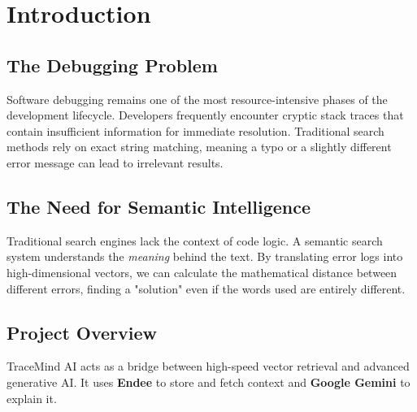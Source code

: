 \documentclass[12pt,a4paper]{report}
\begin{document}
\tableofcontents
\newpage

\chapter{Introduction}
\section{The Debugging Problem}
Software debugging remains one of the most resource-intensive phases of the development lifecycle. Developers frequently encounter cryptic stack traces that contain insufficient information for immediate resolution. Traditional search methods rely on exact string matching, meaning a typo or a slightly different error message can lead to irrelevant results.

\section{The Need for Semantic Intelligence}
Traditional search engines lack the context of code logic. A semantic search system understands the \textit{meaning} behind the text. By translating error logs into high-dimensional vectors, we can calculate the mathematical distance between different errors, finding a "solution" even if the words used are entirely different.

\section{Project Overview}
TraceMind AI acts as a bridge between high-speed vector retrieval and advanced generative AI. It uses \textbf{Endee} to store and fetch context and \textbf{Google Gemini} to explain it.

\end{document}

